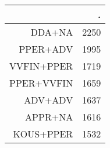 \begin{tabular}{rr}
  \hline
 & . \\ 
  \hline
DDA+NA & 2250 \\ 
  PPER+ADV & 1995 \\ 
  VVFIN+PPER & 1719 \\ 
  PPER+VVFIN & 1659 \\ 
  ADV+ADV & 1637 \\ 
  APPR+NA & 1616 \\ 
  KOUS+PPER & 1532 \\ 
   \hline
\end{tabular}
